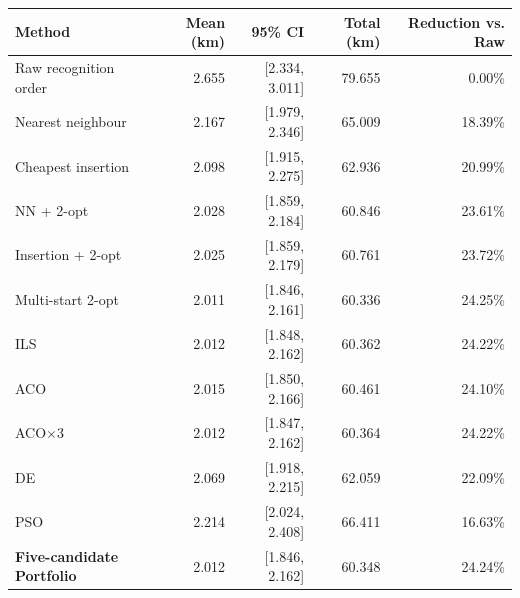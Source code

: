 \begin{tabular}{lrrrr}
\toprule
Method & Mean (km) & 95\% CI & Total (km) & Reduction vs. Raw \\
\midrule
Raw recognition order & 2.655 & [2.334, 3.011] & 79.655 & 0.00\% \\
Nearest neighbour & 2.167 & [1.979, 2.346] & 65.009 & 18.39\% \\
Cheapest insertion & 2.098 & [1.915, 2.275] & 62.936 & 20.99\% \\
NN + 2-opt & 2.028 & [1.859, 2.184] & 60.846 & 23.61\% \\
Insertion + 2-opt & 2.025 & [1.859, 2.179] & 60.761 & 23.72\% \\
Multi-start 2-opt & 2.011 & [1.846, 2.161] & 60.336 & 24.25\% \\
ILS & 2.012 & [1.848, 2.162] & 60.362 & 24.22\% \\
ACO & 2.015 & [1.850, 2.166] & 60.461 & 24.10\% \\
ACO$\times$3 & 2.012 & [1.847, 2.162] & 60.364 & 24.22\% \\
DE & 2.069 & [1.918, 2.215] & 62.059 & 22.09\% \\
PSO & 2.214 & [2.024, 2.408] & 66.411 & 16.63\% \\
\bfseries Five-candidate Portfolio & 2.012 & [1.846, 2.162] & 60.348 & 24.24\% \\
\bottomrule
\end{tabular}
